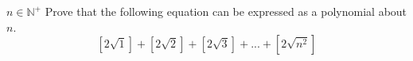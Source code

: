 $n \in \mathbb {N^+}$
Prove that the following equation can be expressed as a polynomial about $n$.
$$\left[2\sqrt {1}\right]+\left[2\sqrt {2}\right]+\left[2\sqrt {3}\right]+ . . . +\left[2\sqrt {n^2}\right]$$